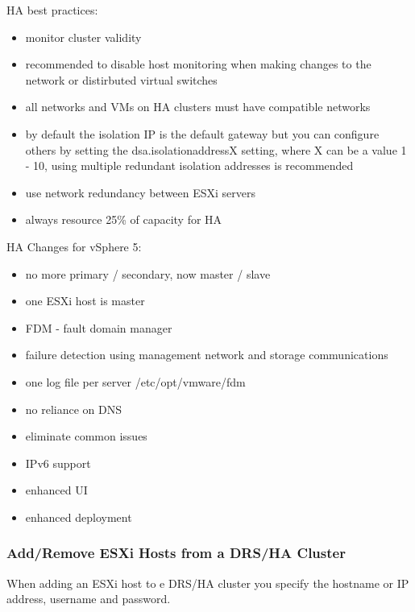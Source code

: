 HA best practices:

\begin{itemize}

\item monitor cluster validity

\item recommended to disable host monitoring when making changes to the
network or distirbuted virtual switches

\item all networks and VMs on HA clusters must have compatible networks

\item by default the isolation IP is the default gateway but you can configure
others by setting the dsa.isolationaddressX setting, where X can be a value 1
- 10, using multiple redundant isolation addresses is recommended

\item use network redundancy between ESXi servers

\item always resource 25\% of capacity for HA
\end{itemize}

HA Changes for vSphere 5:

\begin{itemize}

\item no more primary / secondary, now master / slave
\item one ESXi host is master
\item FDM - fault domain manager
\item failure detection using management network and storage communications
\item one log file per server /etc/opt/vmware/fdm
\item no reliance on DNS
\item eliminate common issues
\item IPv6 support
\item enhanced UI
\item enhanced deployment

\end{itemize}

\subsubsection{Add/Remove ESXi Hosts from a DRS/HA Cluster}

When adding an ESXi host to e DRS/HA cluster you specify the hostname or
IP address, username and password.

